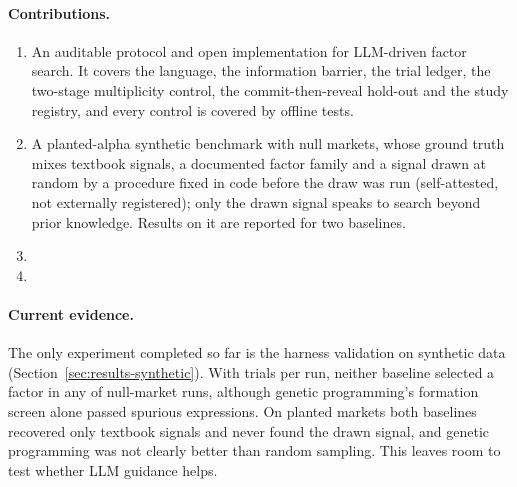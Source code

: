 \paragraph{Contributions.}
\begin{enumerate}
  \item An auditable protocol and open implementation for LLM-driven factor
    search. It covers the language, the information barrier, the trial
    ledger, the two-stage multiplicity control, the commit-then-reveal
    hold-out and the study registry, and every control is covered by offline
    tests.
  \item A planted-alpha synthetic benchmark with null markets, whose ground
    truth mixes textbook signals, a documented factor family and a signal
    drawn at random by a procedure fixed in code before the draw was run
    (self-attested, not externally registered); only the drawn signal
    speaks to search beyond prior knowledge. Results on it are reported for
    two baselines.
  \item {}
  \item {}
\end{enumerate}

\paragraph{Current evidence.} The only experiment completed so far is the
harness validation on synthetic data (Section~\ref{sec:results-synthetic}).
With \SynBudget{} trials per run, neither baseline selected a factor in any
of \SynNullRuns{} null-market runs, although genetic programming's formation
screen alone passed spurious expressions. On planted markets both baselines
recovered only textbook signals and never found the drawn signal, and
genetic programming was not clearly better than random sampling. This leaves
room to test whether LLM guidance helps. 
